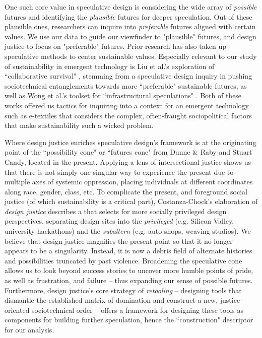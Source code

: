 One such core value in speculative design is considering the wide array of \textit{possible} futures and identifying the \textit{plausible} futures for deeper speculation. Out of these plausible ones, researchers can inquire into \textit{preferable} futures aligned with certain values. We use our data to guide our viewfinder to "plausible" futures, and design justice to focus on "preferable" futures.
Prior research has also taken up speculative methods to center sustainable values. Especially relevant to our study of sustainability in emergent technology is Liu et al.'s exploration of ``collaborative survival" \cite{liu_design_2018}, stemming from a speculative design inquiry in pushing sociotechnical entanglements towards more ``preferable" sustainable futures, as well as Wong et al.'s toolset for ``infrastructural speculations" \cite{wong_infrastructural_2020}. Both of these works offered us tactics for inquiring into a context for an emergent technology such as e-textiles that considers the complex, often-fraught sociopolitical factors that make sustainability such a wicked problem. 

Where design justice enriches speculative design's framework is at the originating point of %
the ``possibility cone" or ``futures cone" from Dunne \& Raby and Stuart Candy\cite{dunne_speculative_2013}, located in the present. Applying a lens of intersectional justice shows us that there is not simply one singular way to experience the present due to multiple axes of systemic oppression, placing individuals at different coordinates along race, gender, class, etc. To complicate the present, and foreground social justice (of which sustainability is a critical part), Costanza-Chock's elaboration of \textit{design justice} \cite{costanza-chock_design_2020} describes a  that selects for more socially privileged design perspectives, separating design sites into the \textit{privileged} (e.g. Silicon Valley, university hackathons) and the \textit{subaltern} (e.g. auto shops, weaving studios). We believe that design justice magnifies the present point so that it no longer appears to be a singularity. Instead, it is now a debris field of alternate histories and possibilities truncated by past violence.
Broadening the speculative cone allows us to look beyond success stories to uncover more humble points of pride, as well as frustration, and failure -- thus expanding our sense of possible futures. Furthermore, design justice's core strategy of \textit{retooling} -- designing tools that dismantle the established matrix of domination and construct a new, justice-oriented sociotechnical order -- offers a framework for designing these tools as components for building further speculation, hence the ``construction" descriptor for our analysis.



